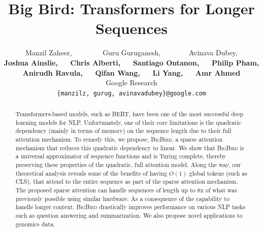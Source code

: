 \documentclass{article}
\title{Big Bird: Transformers for Longer Sequences}
\author{%
  Manzil Zaheer, $\quad$ $\quad$ $\quad$ Guru Guruganesh, $\quad$ $\quad$ $\quad$Avinava Dubey, \\
  {\bf  Joshua Ainslie, $\quad$ Chris Alberti, $\quad$ Santiago Ontanon, $\quad$ Philip Pham,}  \\
  {\bf Anirudh Ravula, $\quad$ Qifan Wang, $\quad$ Li Yang, $\quad$ Amr Ahmed } \\
  Google Research\\
  \texttt{\{manzilz, gurug, avinavadubey\}@google.com}
}
\newcommand{\bigb}{\textsc{BigBird}\xspace}
\begin{document}
\maketitle
\begin{abstract}

Transformers-based models, such as BERT, have been one of the most successful deep learning models for NLP. Unfortunately, one of their core limitations is the quadratic dependency (mainly in terms of memory) on the sequence length due to their full attention mechanism.  To remedy this, we propose, \bigb, a sparse attention mechanism that reduces this quadratic dependency to linear.  We show that \bigb is a universal approximator of sequence functions and is Turing complete, thereby preserving these  properties of the quadratic, full attention model. Along the way, our theoretical analysis reveals  some of the benefits of having $O(1)$ global tokens (such as CLS), that attend to the entire sequence  as part of the sparse attention mechanism. The proposed sparse attention can handle sequences of length up to 8x of  what was previously possible using  similar hardware.  As a consequence of the capability to handle longer context, \bigb  drastically improves performance  on various NLP tasks  such as question answering and summarization. We also propose novel applications to genomics data.
\end{abstract}

















\newpage
\appendix

\end{document}
